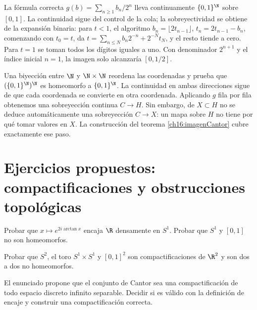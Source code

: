 \begin{observacion}
La fórmula correcta $g(b)=\sum_{n\ge1}b_n/2^n$ lleva continuamente $\{0,1\}^{\N}$ sobre $[0,1]$. La continuidad sigue del control de la cola; la sobreyectividad se obtiene de la expansión binaria: para $t<1$, el algoritmo $b_n=\lfloor2t_{n-1}\rfloor$, $t_n=2t_{n-1}-b_n$, comenzando con $t_0=t$, da $t=\sum_{n\le N}b_n2^{-n}+2^{-N}t_N$, y el resto tiende a cero. Para $t=1$ se toman todos los dígitos iguales a uno. Con denominador $2^{n+1}$ y el índice inicial $n=1$, la imagen solo alcanzaría $[0,1/2]$.

Una biyección entre $\N$ y $\N\times\N$ reordena las coordenadas y prueba que $(\{0,1\}^{\N})^{\N}$ es homeomorfo a $\{0,1\}^{\N}$. La continuidad en ambas direcciones sigue de que cada coordenada se convierte en otra coordenada. Aplicando $g$ fila por fila obtenemos una sobreyección continua $C\to H$. Sin embargo, de $X\subset H$ no se deduce automáticamente una sobreyección $C\to X$: un mapa sobre $H$ no tiene por qué tomar valores en $X$. La construcción del teorema \ref{ch16:imagenCantor} cubre exactamente ese paso.
\end{observacion}

\section{Ejercicios propuestos: compactificaciones y obstrucciones topológicas}
\begin{ejercicio}\label{ej:lectura-16-1}
Probar que $x\mapsto e^{2i\arctan x}$ encaja $\R$ densamente en $S^1$. Probar que $S^1$ y $[0,1]$ no son homeomorfos.
\end{ejercicio}


\begin{ejercicio}\label{ej:lectura-16-2}
Probar que $S^2$, el toro $S^1\times S^1$ y $[0,1]^2$ son compactificaciones de $\R^2$ y son dos a dos no homeomorfos.
\end{ejercicio}


\begin{ejercicio}\label{ej:lectura-16-3}
El enunciado propone que el conjunto de Cantor sea una compactificación de todo espacio discreto infinito separable. Decidir si es válido con la definición de encaje y construir una compactificación correcta.
\end{ejercicio}


